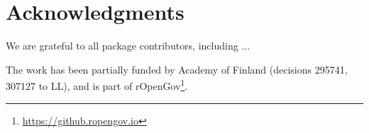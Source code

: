 \documentclass[article]{jss}
\begin{document}

\section*{Acknowledgments}

We are grateful to all package contributors, including ... 

The work has been partially funded by Academy of Finland (decisions 295741, 307127 to LL), and is part of rOpenGov\footnote{\url{https://github.ropengov.io}}.


\end{document}
